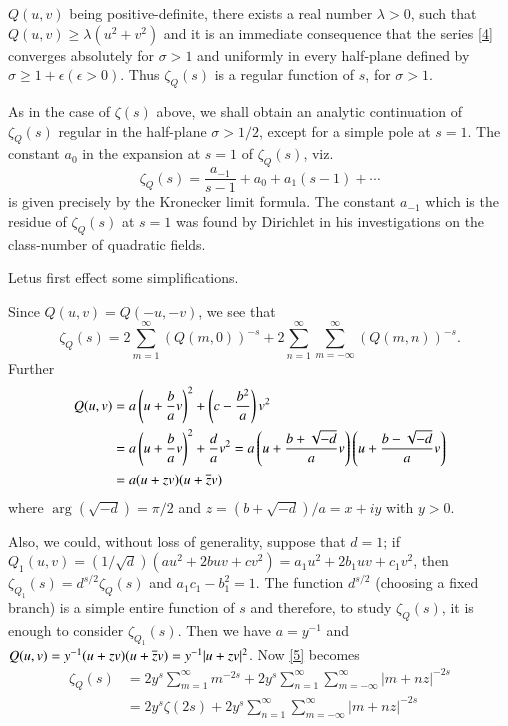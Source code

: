 $Q(u,v)$ being positive-definite, there exists a real number
$\lambda>0$, such that $Q(u,v)\geq \lambda (u^{2}+v^{2})$ and it is an
immediate consequence that the series \eqref{4} converges absolutely
for $\sigma>1$ and uniformly in every half-plane defined by
$\sigma\geq 1+\epsilon(\epsilon>0)$. Thus $\zeta_{Q}(s)$ is a regular
function of $s$, for $\sigma>1$.

As in the case of $\zeta(s)$ above, we shall obtain an analytic
continuation of $\zeta_{Q}(s)$ regular in the half-plane $\sigma>1/2$,
except for a simple pole at $s=1$. The constant $a_{0}$ in the
expansion at $s=1$ of $\zeta_{Q}(s)$, viz.
$$
\zeta_{Q}(s)=\frac{a_{-1}}{s-1}+a_{0}+a_{1}(s-1)+\cdots
$$
is given precisely by the Kronecker limit formula. The constant
$a_{-1}$ which is the residue of $\zeta_{Q}(s)$ at $s=1$ was found by
Dirichlet in his investigations on the class-number of quadratic
fields.

Let\pageoriginale us first effect some simplifications.

Since $Q(u,v)=Q(-u,-v)$, we see that
\begin{equation*}
\zeta_{Q}(s)=2\sum^{\infty}_{m=1}(Q(m,0))^{-s}+2\sum^{\infty}_{n=1}\sum^{\infty}_{m=-\infty}(Q(m,n))^{-s}.\tag{5}\label{5} 
\end{equation*}
Further
\begin{align*}
Q(u,v) &=
a\left(u+\frac{b}{a}v\right)^{2}+\left(c-\frac{b^{2}}{a}\right)v^{2}\\
&=
a\left(u+\frac{b}{a}v\right)^{2}+\frac{d}{a}v^{2}=a\left(u+\frac{b+\sqrt{-d}}{a}v\right)\left(u+\frac{b-\sqrt{-d}}{a}v\right)\\
&= a(u+zv)(u+\overline{z}v)
\end{align*}
where $\arg(\sqrt{-d})=\pi/2$ and $z=(b+\sqrt{-d})/a=x+iy$ with
$y>0$. 

Also, we could, without loss of generality, suppose that $d=1$; if
$Q_{1}(u,v)=(1/\sqrt{d})(au^{2}+2buv+cv^{2})=a_{1}u^{2}+2b_{1}uv+c_{1}v^{2}$,
then $\zeta_{Q_{1}}(s)=d^{s/2}\zeta_{Q}(s)$ and
$a_{1}c_{1}-b^{2}_{1}=1$. The function $d^{s/2}$ (choosing a fixed
branch) is a simple entire function of $s$ and therefore, to study
$\zeta_{Q}(s)$, it is enough to consider $\zeta_{Q_{1}}(s)$. Then we
have $a=y^{-1}$ and
$Q(u,v)=y^{-1}(u+zv)(u+\overline{z}v)=y^{-1}|u+zv|^{2}$. Now \eqref{5}
becomes
\begin{align*}
\zeta_{Q}(s) &=
2y^{s}\sum^{\infty}_{m=1}m^{-2s}+2y^{s}\sum^{\infty}_{n=1}\sum^{\infty}_{m=-\infty}|m+nz|^{-2s}\\
&=
2y^{s}\zeta(2s)+2y^{s}\sum^{\infty}_{n=1}\sum^{\infty}_{m=-\infty}|m+nz|^{-2s}\tag{6}\label{6} 
\end{align*}

